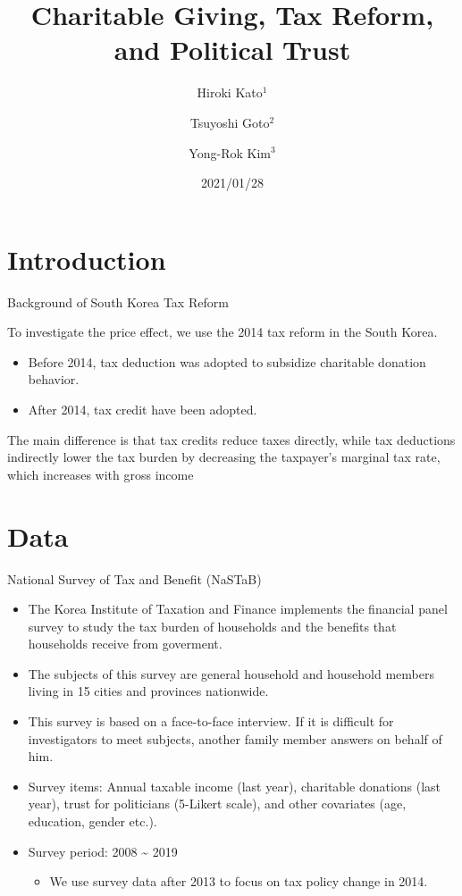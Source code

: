 \documentclass[
  ignorenonframetext,
]{beamer}
\title{Charitable Giving, Tax Reform, and Political Trust}
\author{Hiroki Kato\(^1\) \and Tsuyoshi Goto\(^2\) \and Yong-Rok Kim\(^3\)}
\date{2021/01/28}
\institute{\(^1\)Osaka University \and \(^2\)Chiba University \and \(^3\)Kobe University}
\providecommand{\tightlist}{%
  \setlength{\itemsep}{0pt}\setlength{\parskip}{0pt}}
\begin{document}
\frame{\titlepage}

\hypertarget{introduction}{%
\section{Introduction}\label{introduction}}

\begin{frame}{Background of South Korea Tax Reform}
\protect\hypertarget{background-of-south-korea-tax-reform}{}

To investigate the price effect, we use the 2014 tax reform in the South
Korea.

\begin{itemize}
\tightlist
\item
  Before 2014, tax deduction was adopted to subsidize charitable
  donation behavior.
\item
  After 2014, tax credit have been adopted.
\end{itemize}

The main difference is that tax credits reduce taxes directly, while tax
deductions indirectly lower the tax burden by decreasing the taxpayer's
marginal tax rate, which increases with gross income

\end{frame}

\hypertarget{data}{%
\section{Data}\label{data}}

\begin{frame}{National Survey of Tax and Benefit (NaSTaB)}
\protect\hypertarget{national-survey-of-tax-and-benefit-nastab}{}

\begin{itemize}
\tightlist
\item
  The Korea Institute of Taxation and Finance implements the financial
  panel survey to study the tax burden of households and the benefits
  that households receive from goverment.
\item
  The subjects of this survey are general household and household
  members living in 15 cities and provinces nationwide.
\item
  This survey is based on a face-to-face interview. If it is difficult
  for investigators to meet subjects, another family member answers on
  behalf of him.
\item
  Survey items: Annual taxable income (last year), charitable donations
  (last year), trust for politicians (5-Likert scale), and other
  covariates (age, education, gender etc.).
\item
  Survey period: 2008 \textasciitilde{} 2019

  \begin{itemize}
  \tightlist
  \item
    We use survey data after 2013 to focus on tax policy change in 2014.
  \end{itemize}
\end{itemize}

\end{frame}
\end{document}
